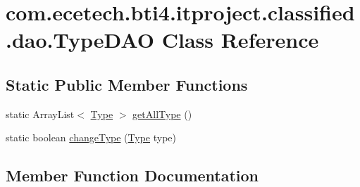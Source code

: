 \hypertarget{classcom_1_1ecetech_1_1bti4_1_1itproject_1_1classified_1_1dao_1_1_type_d_a_o}{}\section{com.\+ecetech.\+bti4.\+itproject.\+classified.\+dao.\+Type\+D\+AO Class Reference}
\label{classcom_1_1ecetech_1_1bti4_1_1itproject_1_1classified_1_1dao_1_1_type_d_a_o}
\subsection*{Static Public Member Functions}
\begin{DoxyCompactItemize}
\item 
static Array\+List$<$ \hyperlink{classcom_1_1ecetech_1_1bti4_1_1itproject_1_1classified_1_1beans_1_1_type}{Type} $>$ \hyperlink{classcom_1_1ecetech_1_1bti4_1_1itproject_1_1classified_1_1dao_1_1_type_d_a_o_af69115a81718e0084ae26106a1a54554}{get\+All\+Type} ()
\item 
static boolean \hyperlink{classcom_1_1ecetech_1_1bti4_1_1itproject_1_1classified_1_1dao_1_1_type_d_a_o_ad711aa6be9097446dd6cc991ad3318c9}{change\+Type} (\hyperlink{classcom_1_1ecetech_1_1bti4_1_1itproject_1_1classified_1_1beans_1_1_type}{Type} type)
\end{DoxyCompactItemize}


\subsection{Member Function Documentation}
